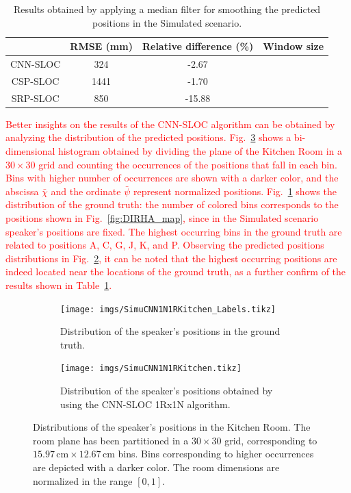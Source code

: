 \documentclass[review]{elsarticle}
\newcommand{\figref}[1]{Fig.~\ref{#1}}
\newcommand{\tableref}[1]{Table~\ref{#1}}
\begin{document}
\begin{table}[t]
\centering
\caption{Results obtained by applying a median filter for smoothing the predicted positions in the Simulated scenario.}\label{tab:smooth_sim}
\begin{tabular}{c | c | c | c}
  	 				& RMSE (mm) & Relative difference (\%) & Window size \\
\hline
CNN-SLOC    & 324 & -2.67  &\\
CSP-SLOC    & 1441 & -1.70 &\\
SRP-SLOC    & 850 & -15.88 &\\
\end{tabular}
\end{table}

\textcolor{red}{
Better insights on the results of the CNN-SLOC algorithm can be obtained by analyzing the distribution of the predicted positions. \figref{fig:distr_simu} shows a bi-dimensional histogram obtained by dividing the plane of the Kitchen Room in a $30 \times 30$ grid and counting the occurrences of the positions that fall in each bin. Bins with higher number of occurrences are shown with a darker color, and the abscissa $\bar{\chi}$ and the ordinate $\bar{\psi}$ represent normalized positions. \figref{fig:distr_simu_gt} shows the distribution of the ground truth: the number of colored bins corresponds to the positions shown in \figref{fig:DIRHA_map}, since in the Simulated scenario speaker's positions are fixed. The highest occurring bins in the ground truth are related to positions A, C, G, J, K, and P. Observing the predicted positions distributions in \figref{fig:distr_simu_pred}, it can be noted that the highest occurring positions are indeed located near the locations of the ground truth, as a further confirm of the results shown in \tableref{tab:smooth_sim}.}

\begin{figure}[t]
\centering
\begin{subfigure}[t]{0.45\textwidth}
\texttt{[image: imgs/SimuCNN1N1RKitchen\_Labels.tikz]}
\caption{Distribution of the speaker's positions in the ground truth.}\label{fig:distr_simu_gt}
\end{subfigure}
\begin{subfigure}[t]{0.45\textwidth}
\texttt{[image: imgs/SimuCNN1N1RKitchen.tikz]}
\caption{Distribution of the speaker's positions obtained by using the CNN-SLOC 1Rx1N algorithm.}\label{fig:distr_simu_pred}
\end{subfigure}
\caption{Distributions of the speaker's positions in the Kitchen Room. The room plane has been partitioned in a $30\times 30$ grid, corresponding to $15.97\,\text{cm} \times 12.67\,\text{cm}$ bins. Bins corresponding to higher occurrences are depicted with a darker color. The room dimensions are normalized in the range $[0,1]$.}\label{fig:distr_simu}
\end{figure}
\end{document}
